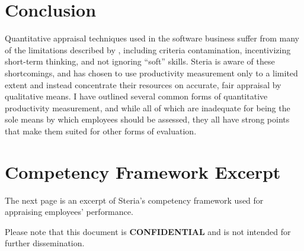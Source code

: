 \documentclass[letterpaper, 12pt]{report}
\begin{document}
\chapter{Conclusion}
Quantitative appraisal techniques used in the software business suffer from many of the limitations described by \textcite{textbook}, including criteria contamination, incentivizing short-term thinking, and not ignoring ``soft'' skills. 
Steria is aware of these shortcomings, and has chosen to use productivity measurement only to a limited extent and instead concentrate their resources on accurate, fair appraisal by qualitative means. 
I have outlined several common forms of quantitative productivity measurement, and while all of which are inadequate for being the sole means by which employees should be assessed, they all have strong points that make them suited for other forms of evaluation.






\appendix

\chapter{Competency Framework Excerpt}
The next page is an excerpt of Steria's competency framework used for appraising employees' performance. 

Please note that this document is \textbf{CONFIDENTIAL} and is not intended for further dissemination. 




\end{document}
